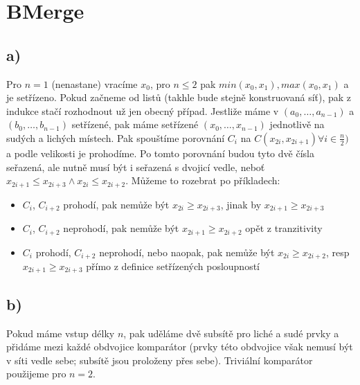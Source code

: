 \documentclass[a4paper]{article}
\begin{document}
\renewcommand{\headrulewidth}{0pt} %
\thispagestyle{fancy} %
{}

\section*{BMerge}
\subsection*{a)}
Pro $n = 1$ (nenastane) vracíme $x_0$, pro $n \le 2$ pak $min(x_0, x_1), max(x_0, x_1)$ a je setřízeno. Pokud začneme od listů (takhle bude stejně konstruovaná síť), pak z indukce stačí rozhodnout už jen obecný případ. Jestliže máme v $(a_0, \ldots, a_{n-1})$ a $(b_0, \ldots, b_{n-1})$ setřízené, pak máme setřízené $(x_0, \ldots, x_{n-1})$ jednotlivě na sudých a lichých místech. Pak spouštíme porovnání $C_i$ na $C(x_{2i}, x_{2i+1}) \forall i \in \frac{n}{2})$ a podle velikosti je prohodíme. Po tomto porovnání budou tyto dvě čísla seřazená, ale nutně musí být i seřazená s dvojicí vedle, neboť $x_{2i+1} \le x_{2i+3} \wedge x_{2i} \le x_{2i+2}$. Můžeme to rozebrat po příkladech:
\begin{itemize}
\item $C_i$, $C_{i+2}$ prohodí, pak nemůže být $x_{2i} \ge x_{2i+3}$, jinak by $x_{2i+1} \ge x_{2i+3}$ \\
\item $C_i$, $C_{i+2}$ neprohodí, pak nemůže být $x_{2i+1} \ge x_{2i+2}$ opět z tranzitivity \\
\item $C_i$ prohodí, $C_{i+2}$ neprohodí, nebo naopak, pak nemůže být $x_{2i} \ge x_{2i+2}$, resp  $x_{2i+1} \ge x_{2i+3}$ přímo z definice setřízených posloupností \\
\end{itemize}

\subsection*{b)}
Pokud máme vstup délky $n$, pak uděláme dvě subsítě pro liché a sudé prvky a přidáme mezi každé obdvojice komparátor (prvky této obdvojice však nemusí být v síti vedle sebe; subsítě jsou proloženy přes sebe). Triviální komparátor použijeme pro $n=2$.
\end{document}
